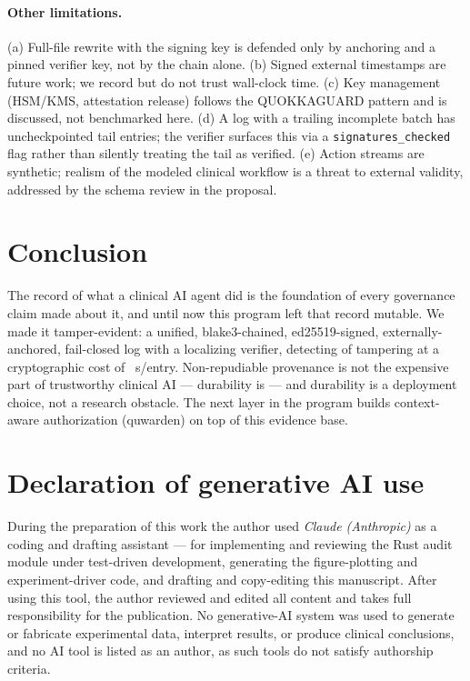 \documentclass[11pt]{article}
\begin{document}
\paragraph{Other limitations.} (a) Full-file rewrite with the signing key is
defended only by anchoring and a pinned verifier key, not by the chain alone. (b)
Signed external timestamps are future work; we record but do not trust wall-clock
time. (c) Key management (HSM/KMS, attestation release) follows the QUOKKAGUARD
pattern and is discussed, not benchmarked here. (d) A log with a trailing incomplete
batch has uncheckpointed tail entries; the verifier surfaces this via a
\texttt{signatures\_checked} flag rather than silently treating the tail as
verified. (e) Action streams are synthetic; realism of the modeled clinical
workflow is a threat to external validity, addressed by the schema review in the
proposal.

\section{Conclusion}
The record of what a clinical AI agent did is the foundation of every governance
claim made about it, and until now this program left that record mutable. We made it
tamper-evident: a unified, blake3-chained, ed25519-signed, externally-anchored,
fail-closed log with a localizing verifier, detecting \TDR{} of tampering at a
cryptographic cost of \ComputeUs~\textmu s/entry. Non-repudiable provenance is not
the expensive part of trustworthy clinical AI --- durability is --- and durability
is a deployment choice, not a research obstacle. The next layer in the program
builds context-aware authorization (quwarden) on top of this evidence base.

\section*{Declaration of generative AI use}
During the preparation of this work the author used \emph{Claude (Anthropic)} as a
coding and drafting assistant --- for implementing and reviewing the Rust audit
module under test-driven development, generating the figure-plotting and
experiment-driver code, and drafting and copy-editing this manuscript. After using
this tool, the author reviewed and edited all content and takes full responsibility
for the publication. No generative-AI system was used to generate or fabricate
experimental data, interpret results, or produce clinical conclusions, and no AI
tool is listed as an author, as such tools do not satisfy authorship criteria.
\end{document}
